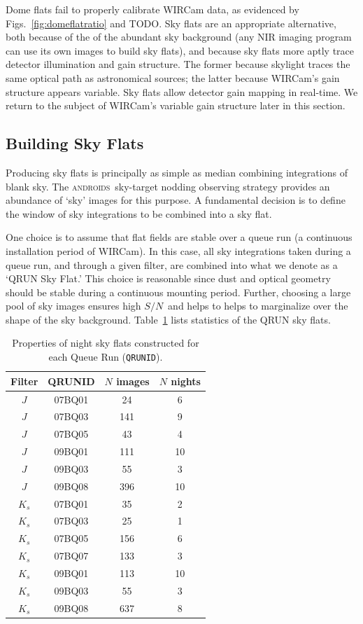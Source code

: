\documentclass[iop]{emulateapj}
\newcommand{\sn}{\ensuremath{S/N}} %
\newcommand{\androids}{\textsc{androids}}
\newcommand{\todo}[1]{\textcolor{RedOrange}{#1}} %
\begin{document}
Dome flats fail to properly calibrate WIRCam data, as evidenced by Figs.~\ref{fig:domeflatratio} and \todo{TODO}.
Sky flats are an appropriate alternative, both because of the of the abundant sky background (any NIR imaging program can use its own images to build sky flats), and because sky flats more aptly trace detector illumination and gain structure.
The former because skylight traces the same optical path as astronomical sources; the latter because WIRCam's gain structure appears variable.
Sky flats allow detector gain mapping in real-time.
We return to the subject of WIRCam's variable gain structure later in this section.

\subsection{Building Sky Flats}
\label{sec:flatbuilding}

Producing sky flats is principally as simple as median combining integrations of blank sky. 
The \androids\ sky-target nodding observing strategy provides an abundance of `sky' images for this purpose.
A fundamental decision is to define the window of sky integrations to be combined into a sky flat.

One choice is to assume that flat fields are stable over a queue run (a continuous installation period of WIRCam).
In this case, all sky integrations taken during a queue run, and through a given filter, are combined into what we denote as a `QRUN Sky Flat.'
This choice is reasonable since dust and optical geometry should be stable during a continuous mounting period.
Further, choosing a large pool of sky images ensures high \sn\, and helps to helps to marginalize over the shape of the sky background.
Table~\ref{tab:flattable} lists statistics of the QRUN sky flats.

\begin{table}[t]
\centering
\caption{Properties of night sky flats constructed for each Queue Run (\texttt{QRUNID}).}
\label{tab:flattable}

\begin{tabular}{cccc}
\hline
Filter & QRUNID & $N$ images & $N$ nights \\
\hline
$J$ & 07BQ01 & 24 & 6 \\
$J$ & 07BQ03 & 141 & 9 \\
$J$ & 07BQ05 & 43 & 4 \\
$J$ & 09BQ01 & 111 & 10 \\
$J$ & 09BQ03 & 55 & 3 \\
$J$ & 09BQ08 & 396 & 10 \\
\hline
$K_s$ & 07BQ01 & 35 & 2 \\
$K_s$ & 07BQ03 & 25 & 1 \\
$K_s$ & 07BQ05 & 156 & 6 \\
$K_s$ & 07BQ07 & 133 & 3 \\
$K_s$ & 09BQ01 & 113 & 10 \\
$K_s$ & 09BQ03 & 55 & 3 \\
$K_s$ & 09BQ08 & 637 & 8 \\
\hline
\end{tabular}
\end{table}
\end{document}
